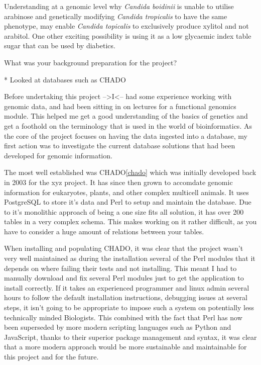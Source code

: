 Understanding at a genomic level why \textit{Candida boidinii} is unable to utilise arabinose and genetically modifying \textit{Candida tropicalis} to have the same phenotype, may enable \textit{Candida topicalis} to exclusively produce xylitol and not arabitol. One other exciting possibility is using it as a low glycaemic index table sugar that can be used by diabetics.

What was your background preparation for the project? 

* Looked at databases such as CHADO

Before undertaking this project -->I<-- had some experience working with genomic data, and had been sitting in on lectures for a functional genomics module. This helped me get a good understanding of the basics of genetics and get a foothold on the terminology that is used in the world of bioinformatics.  As the core of the project focuses on having the data ingested into a database, my first action was to investigate the current database solutions that had been developed for genomic information. 

The most well established was CHADO\ref{chado} which was initially developed back in 2003 for the xyz project. It has since then grown to accomdate genomic information for eukaryotes, plants, and other complex multicell animals. It uses PostgreSQL to store it's data and Perl to setup and maintain the database. Due to it's monolithic approach of being a one size fits all solution, it has over 200 tables in a very complex schema. This makes working on it rather difficult, as you have to consider a huge amount of relations between your tables. 

When installing and populating CHADO, it was clear that the project wasn't very well maintained as during the installation several of the Perl modules that it depends on where failing their tests and not installing. This meant I had to manually download and fix several Perl modules just to get the application to install correctly. If it takes an experienced programmer and linux admin several hours to follow the default installation instructions, debugging issues at several steps, it isn't going to be appropriate to impose such a system on potentially less technically minded Biologists. This combined with the fact that Perl has now been superseded by more modern scripting languages such as Python and JavaScript, thanks to their superior package management and syntax, it was clear that a more modern approach would be more sustainable and maintainable for this project and for the future. 

